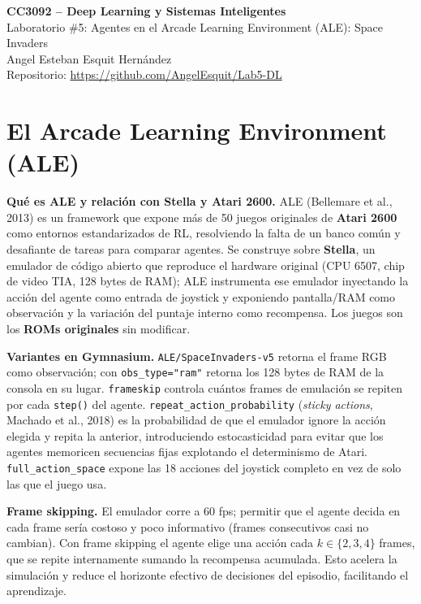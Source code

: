 \documentclass[10pt]{article}
\newcommand{\rhead}[1]{\textbf{#1}}
\begin{document}

\begin{center}
{\large\bfseries CC3092 -- Deep Learning y Sistemas Inteligentes}\\[2pt]
{\large Laboratorio \#5: Agentes en el Arcade Learning Environment (ALE): Space Invaders}\\[2pt]
\small Angel Esteban Esquit Hernández\\[2pt]
\small Repositorio: \url{https://github.com/AngelEsquit/Lab5-DL}
\end{center}
\vspace{-4pt}

\section{El Arcade Learning Environment (ALE)}

\rhead{Qué es ALE y relación con Stella y Atari 2600.} ALE (Bellemare et al., 2013) es un framework que expone más de 50 juegos originales de \textbf{Atari 2600} como entornos estandarizados de RL, resolviendo la falta de un banco común y desafiante de tareas para comparar agentes. Se construye sobre \textbf{Stella}, un emulador de código abierto que reproduce el hardware original (CPU 6507, chip de video TIA, 128 bytes de RAM); ALE instrumenta ese emulador inyectando la acción del agente como entrada de joystick y exponiendo pantalla/RAM como observación y la variación del puntaje interno como recompensa. Los juegos son los \textbf{ROMs originales} sin modificar.

\rhead{Variantes en Gymnasium.} \texttt{ALE/SpaceInvaders-v5} retorna el frame RGB como observación; con \texttt{obs\_type="ram"} retorna los 128 bytes de RAM de la consola en su lugar. \texttt{frameskip} controla cuántos frames de emulación se repiten por cada \texttt{step()} del agente. \texttt{repeat\_action\_probability} (\emph{sticky actions}, Machado et al., 2018) es la probabilidad de que el emulador ignore la acción elegida y repita la anterior, introduciendo estocasticidad para evitar que los agentes memoricen secuencias fijas explotando el determinismo de Atari. \texttt{full\_action\_space} expone las 18 acciones del joystick completo en vez de solo las que el juego usa.

\rhead{Frame skipping.} El emulador corre a 60 fps; permitir que el agente decida en cada frame sería costoso y poco informativo (frames consecutivos casi no cambian). Con frame skipping el agente elige una acción cada $k\in\{2,3,4\}$ frames, que se repite internamente sumando la recompensa acumulada. Esto acelera la simulación y reduce el horizonte efectivo de decisiones del episodio, facilitando el aprendizaje.
\end{document}
